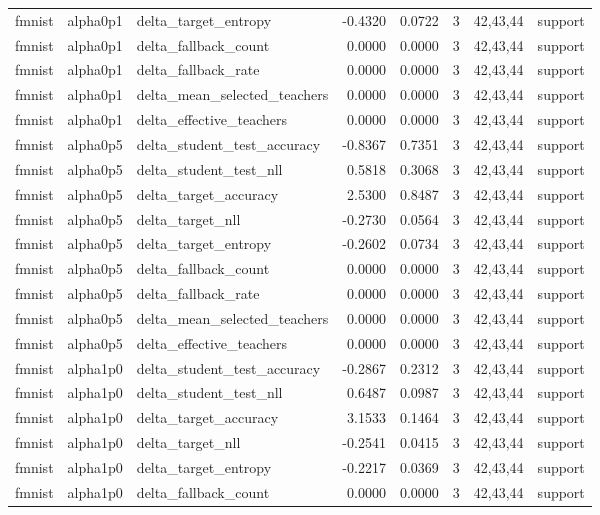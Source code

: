 \begin{tabular}{lllrrrll}
fmnist & alpha0p1 & delta\_target\_entropy & -0.4320 & 0.0722 & 3 & 42,43,44 & support \\
fmnist & alpha0p1 & delta\_fallback\_count & 0.0000 & 0.0000 & 3 & 42,43,44 & support \\
fmnist & alpha0p1 & delta\_fallback\_rate & 0.0000 & 0.0000 & 3 & 42,43,44 & support \\
fmnist & alpha0p1 & delta\_mean\_selected\_teachers & 0.0000 & 0.0000 & 3 & 42,43,44 & support \\
fmnist & alpha0p1 & delta\_effective\_teachers & 0.0000 & 0.0000 & 3 & 42,43,44 & support \\
fmnist & alpha0p5 & delta\_student\_test\_accuracy & -0.8367 & 0.7351 & 3 & 42,43,44 & support \\
fmnist & alpha0p5 & delta\_student\_test\_nll & 0.5818 & 0.3068 & 3 & 42,43,44 & support \\
fmnist & alpha0p5 & delta\_target\_accuracy & 2.5300 & 0.8487 & 3 & 42,43,44 & support \\
fmnist & alpha0p5 & delta\_target\_nll & -0.2730 & 0.0564 & 3 & 42,43,44 & support \\
fmnist & alpha0p5 & delta\_target\_entropy & -0.2602 & 0.0734 & 3 & 42,43,44 & support \\
fmnist & alpha0p5 & delta\_fallback\_count & 0.0000 & 0.0000 & 3 & 42,43,44 & support \\
fmnist & alpha0p5 & delta\_fallback\_rate & 0.0000 & 0.0000 & 3 & 42,43,44 & support \\
fmnist & alpha0p5 & delta\_mean\_selected\_teachers & 0.0000 & 0.0000 & 3 & 42,43,44 & support \\
fmnist & alpha0p5 & delta\_effective\_teachers & 0.0000 & 0.0000 & 3 & 42,43,44 & support \\
fmnist & alpha1p0 & delta\_student\_test\_accuracy & -0.2867 & 0.2312 & 3 & 42,43,44 & support \\
fmnist & alpha1p0 & delta\_student\_test\_nll & 0.6487 & 0.0987 & 3 & 42,43,44 & support \\
fmnist & alpha1p0 & delta\_target\_accuracy & 3.1533 & 0.1464 & 3 & 42,43,44 & support \\
fmnist & alpha1p0 & delta\_target\_nll & -0.2541 & 0.0415 & 3 & 42,43,44 & support \\
fmnist & alpha1p0 & delta\_target\_entropy & -0.2217 & 0.0369 & 3 & 42,43,44 & support \\
fmnist & alpha1p0 & delta\_fallback\_count & 0.0000 & 0.0000 & 3 & 42,43,44 & support \\

\end{tabular}
